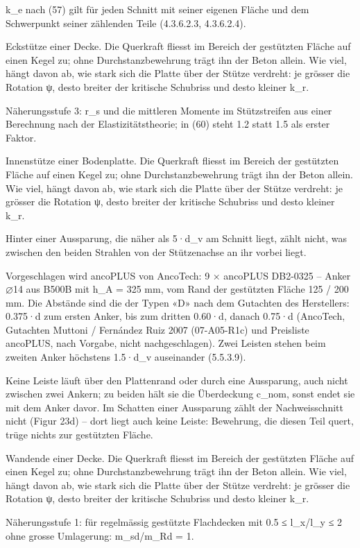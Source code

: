 \documentclass[11pt,a4paper]{article}
\begin{document}
k\_e nach (57) gilt für jeden Schnitt mit seiner eigenen Fläche und dem Schwerpunkt seiner zählenden Teile (4.3.6.2.3, 4.3.6.2.4).

Eckstütze einer Decke. Die Querkraft fliesst im Bereich der gestützten Fläche auf einen Kegel zu; ohne Durchstanzbewehrung trägt ihn der Beton allein. Wie viel, hängt davon ab, wie stark sich die Platte über der Stütze verdreht: je grösser die Rotation ψ, desto breiter der kritische Schubriss und desto kleiner k\_r.

Näherungsstufe 3: r\_s und die mittleren Momente im Stützstreifen aus einer Berechnung nach der Elastizitätstheorie; in (60) steht 1.2 statt 1.5 als erster Faktor.

Innenstütze einer Bodenplatte. Die Querkraft fliesst im Bereich der gestützten Fläche auf einen Kegel zu; ohne Durchstanzbewehrung trägt ihn der Beton allein. Wie viel, hängt davon ab, wie stark sich die Platte über der Stütze verdreht: je grösser die Rotation ψ, desto breiter der kritische Schubriss und desto kleiner k\_r.

Hinter einer Aussparung, die näher als 5·d\_v am Schnitt liegt, zählt nicht, was zwischen den beiden Strahlen von der Stützenachse an ihr vorbei liegt.

Vorgeschlagen wird ancoPLUS von AncoTech: 9 × ancoPLUS DB2-0325 -- Anker ⌀14 aus B500B mit h\_A = 325 mm, vom Rand der gestützten Fläche 125 / 200 mm. Die Abstände sind die der Typen «D» nach dem Gutachten des Herstellers: 0.375·d zum ersten Anker, bis zum dritten 0.60·d, danach 0.75·d (AncoTech, Gutachten Muttoni / Fernández Ruiz 2007 (07-A05-R1c) und Preisliste ancoPLUS, nach Vorgabe, nicht nachgeschlagen). Zwei Leisten stehen beim zweiten Anker höchstens 1.5·d\_v auseinander (5.5.3.9).

Keine Leiste läuft über den Plattenrand oder durch eine Aussparung, auch nicht zwischen zwei Ankern; zu beiden hält sie die Überdeckung c\_nom, sonst endet sie mit dem Anker davor. Im Schatten einer Aussparung zählt der Nachweisschnitt nicht (Figur 23d) -- dort liegt auch keine Leiste: Bewehrung, die diesen Teil quert, trüge nichts zur gestützten Fläche.

Wandende einer Decke. Die Querkraft fliesst im Bereich der gestützten Fläche auf einen Kegel zu; ohne Durchstanzbewehrung trägt ihn der Beton allein. Wie viel, hängt davon ab, wie stark sich die Platte über der Stütze verdreht: je grösser die Rotation ψ, desto breiter der kritische Schubriss und desto kleiner k\_r.

Näherungsstufe 1: für regelmässig gestützte Flachdecken mit 0.5 ≤ l\_x/l\_y ≤ 2 ohne grosse Umlagerung: m\_sd/m\_Rd = 1.
\end{document}
